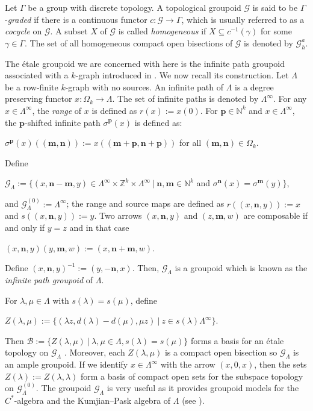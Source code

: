 \documentclass[12pt]{amsart}
\newcommand{\N}{\mathbf{n}}
\newcommand{\M}{\mathbf{m}}
\theoremstyle{definition}
\theoremstyle{remark}
\begin{document}
Let $\Gamma$ be a group with discrete topology. A topological groupoid $\mathcal{G}$ is said to be $\Gamma$-\emph{graded} if there is a continuous functor $c:\mathcal{G}\longrightarrow \Gamma$, which is usually referred to as a \emph{cocycle} on $\mathcal{G}$. A subset $X$ of $\mathcal{G}$ is called \emph{homogeneous} if $X\subseteq c^{-1}(\gamma)$ for some $\gamma\in \Gamma$. The set of all homogeneous compact open bisections of $\mathcal{G}$ is denoted by $\mathcal{G}_h^a$. 

The \'{e}tale groupoid we are concerned with here is the infinite path groupoid associated with a $k$-graph introduced in \cite{Kumjian--Pask}. We now recall its construction. Let $\Lambda$ be a row-finite $k$-graph with no sources. An infinite path of $\Lambda$ is a degree preserving functor $x:\Omega_k\longrightarrow \Lambda$. The set of infinite paths is denoted by $\Lambda^\infty$. For any $x\in \Lambda^\infty$, the \emph{range} of $x$ is defined as $r(x):=x(0)$. For $\mathbf{p}\in \mathbb{N}^k$ and $x\in \Lambda^\infty$, the $\mathbf{p}$-shifted infinite path $\sigma^\mathbf{p}(x)$ is defined as:
\begin{center}
    $\sigma^\mathbf{p}(x)((\M,\N)):=x((\M+\mathbf{p},\N+\mathbf{p}))$ for all $(\M,\N)\in \Omega_k$.
\end{center} 
Define \begin{center}
    $\mathcal{G}_\Lambda:=\{(x,\N-\M,y)\in \Lambda^\infty \times \mathbb{Z}^k \times \Lambda^\infty~|~\N,\M\in \mathbb{N}^k$ and $\sigma^\N (x)=\sigma^\M(y)\}$,
\end{center}
and $\mathcal{G}_\Lambda^{(0)}:=\Lambda^\infty$; the range and source maps are defined as $r((x,\N,y)):=x$ and $s((x,\N,y)):=y$. Two arrows $(x,\N,y)$ and $(z,\M,w)$ are composable if and only if $y=z$ and in that case
\begin{center}
    $(x,\N,y)(y,\M,w):=(x,\N+\M,w)$.
\end{center}
Define $(x,\N,y)^{-1}:=(y,-\N,x)$. Then, $\mathcal{G}_\Lambda$ is a groupoid which is known as the \emph{infinite path groupoid} of $\Lambda$. 

For $\lambda,\mu\in \Lambda$ with $s(\lambda)=s(\mu)$, define
\begin{center}
    $Z(\lambda,\mu):=\{(\lambda z, d(\lambda)-d(\mu), \mu z)~|~z\in s(\lambda)\Lambda^\infty\}$.
\end{center}
Then $\mathcal{B}:=\{Z(\lambda,\mu)~|~ \lambda,\mu\in \Lambda, s(\lambda)=s(\mu)\}$ forms a basis for an \'{e}tale topology on $\mathcal{G}_\Lambda$ \cite[Proposition 2.8]{Kumjian--Pask}. Moreover, each $Z(\lambda,\mu)$ is a compact open bisection so $\mathcal{G}_\Lambda$ is an ample groupoid. If we identify $x\in \Lambda^\infty$ with the arrow $(x,0,x)$, then the sets $Z(\lambda):=Z(\lambda,\lambda)$ form a basis of compact open sets for the subspace topology on $\mathcal{G}_\Lambda^{(0)}$. The groupoid $\mathcal{G}_\Lambda$ is very useful as it provides groupoid models for the $C^*$-algebra and the Kumjian--Pask algebra of $\Lambda$ (see \cite{Kumjian--Pask, Clark}).
\end{document}
